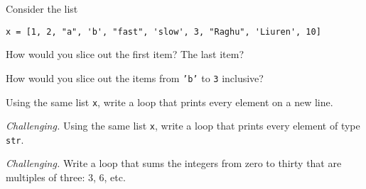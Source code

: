 \documentclass[11pt]{exam}
\begin{document}
\begin{questions}
\item Consider the list
\begin{verbatim}
x = [1, 2, "a", 'b', "fast", 'slow', 3, "Raghu", 'Liuren', 10]
\end{verbatim}
\begin{parts}
\item How would you slice out the first item?  The last item?
\item How would you slice out the items from {\tt 'b'} to {\tt 3} inclusive?
\end{parts}

\item Using the same list {\tt x}, write a loop that prints every element on a new line.

\item {\it Challenging.\/}
Using the same list {\tt x}, write a loop that prints every element of type {\tt str}.


\begin{comment} 
\item Suppose the current price of corn is \$1.20.
The price is set to increase by 10 cents every weekday until it hits \$2.50.
(Nothing happens on weekends.)
At that point it will switch directions and decrease by 10 cents a day. 
Finish the code below to print the price of corn every day until it reaches \$2.50.
\begin{verbatim}
days = ["M", "T", "W", "Th", "F"]
starting_price = 1.20
current_price = starting_price
while True:
for day in days:
    current_price = current_price + 0.10
    print("The price on ", day, "is ", current_price)
if current_price == 2.50:
    break
\end{verbatim}
\end{comment}

\item {\it Challenging.\/}
Write a loop that sums the integers from zero to thirty that are multiples of three:
3, 6, etc.





\end{questions}
\end{document}
